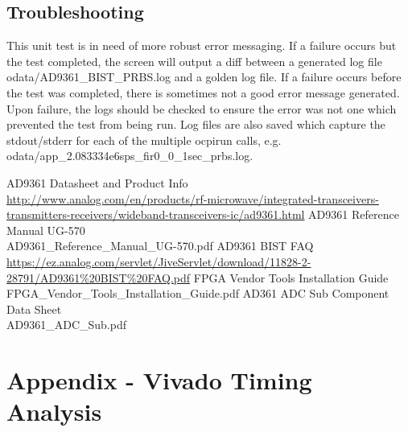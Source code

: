 \documentclass{article}
\begin{document}
\subsection*{Troubleshooting}
This unit test is in need of more robust error messaging. If a failure occurs but the test completed, the screen will output a diff between a generated log file odata/AD9361\_BIST\_PRBS.log and a golden log file. If a failure occurs before the test was completed, there is sometimes not a good error message generated. Upon failure, the logs should be checked to ensure the error was not one which prevented the test from being run. Log files are also saved which capture the stdout/stderr for each of the multiple ocpirun calls, e.g. odata/app\_2.083334e6sps\_fir0\_0\_1sec\_prbs.log.

\pagebreak
\begin{thebibliography}{1}

 AD9361 Datasheet and Product Info \\
\url{http://www.analog.com/en/products/rf-microwave/integrated-transceivers-transmitters-receivers/wideband-transceivers-ic/ad9361.html}
 AD9361 Reference Manual UG-570\\
AD9361\_Reference\_Manual\_UG-570.pdf
 AD9361 BIST FAQ \\
\url{https://ez.analog.com/servlet/JiveServlet/download/11828-2-28791/AD9361%20BIST%20FAQ.pdf}
 FPGA Vendor Tools Installation Guide \\
FPGA\_Vendor\_Tools\_Installation\_Guide.pdf
 AD361 ADC Sub Component Data Sheet \\AD9361\_ADC\_Sub.pdf
 
\end{thebibliography}
\pagebreak
\section{Appendix - Vivado Timing Analysis} \label{appendix}
\end{document}
